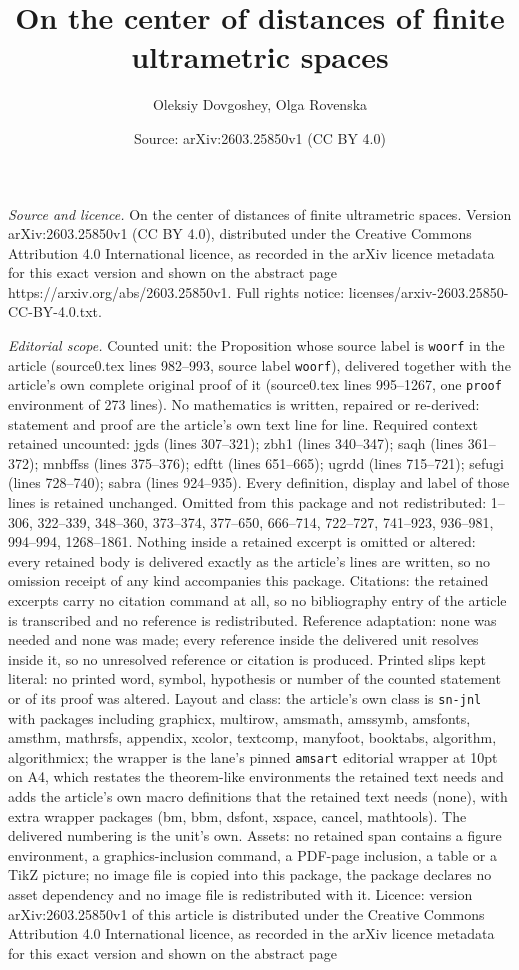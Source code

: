 \documentclass[10pt,a4paper]{amsart}
\title[On the center of distances of finite ultrametric spaces]{On the center of distances of finite ultrametric spaces}
\author{Oleksiy Dovgoshey, Olga Rovenska}
\date{Source: arXiv:2603.25850v1 (CC BY 4.0)}
\begin{document}
\maketitle

\noindent\emph{Source and licence.} On the center of distances of finite ultrametric spaces. Version arXiv:2603.25850v1 (CC BY 4.0), distributed under the Creative Commons Attribution 4.0 International licence, as recorded in the arXiv licence metadata for this exact version and shown on the abstract page https://arxiv.org/abs/2603.25850v1. Full rights notice: licenses/arxiv-2603.25850-CC-BY-4.0.txt.\par\smallskip

\noindent\textit{Editorial scope.} Counted unit: the Proposition whose source label is \texttt{woorf} in the article (source0.tex lines 982--993, source label \texttt{woorf}), delivered together with the article's own complete original proof of it (source0.tex lines 995--1267, one \texttt{proof} environment of 273 lines). No mathematics is written, repaired or re-derived: statement and proof are the article's own text line for line. Required context retained uncounted: jgds (lines 307--321); zbh1 (lines 340--347); saqh (lines 361--372); mnbffss (lines 375--376); edftt (lines 651--665); ugrdd (lines 715--721); sefugi (lines 728--740); sabra (lines 924--935). Every definition, display and label of those lines is retained unchanged. Omitted from this package and not redistributed: 1--306, 322--339, 348--360, 373--374, 377--650, 666--714, 722--727, 741--923, 936--981, 994--994, 1268--1861. Nothing inside a retained excerpt is omitted or altered: every retained body is delivered exactly as the article's lines are written, so no omission receipt of any kind accompanies this package. Citations: the retained excerpts carry no citation command at all, so no bibliography entry of the article is transcribed and no reference is redistributed. Reference adaptation: none was needed and none was made; every reference inside the delivered unit resolves inside it, so no unresolved reference or citation is produced. Printed slips kept literal: no printed word, symbol, hypothesis or number of the counted statement or of its proof was altered. Layout and class: the article's own class is \texttt{sn-jnl} with packages including graphicx, multirow, amsmath, amssymb, amsfonts, amsthm, mathrsfs, appendix, xcolor, textcomp, manyfoot, booktabs, algorithm, algorithmicx; the wrapper is the lane's pinned \texttt{amsart} editorial wrapper at 10pt on A4, which restates the theorem-like environments the retained text needs and adds the article's own macro definitions that the retained text needs (none), with extra wrapper packages (bm, bbm, dsfont, xspace, cancel, mathtools). The delivered numbering is the unit's own. Assets: no retained span contains a figure environment, a graphics-inclusion command, a PDF-page inclusion, a table or a TikZ picture; no image file is copied into this package, the package declares no asset dependency and no image file is redistributed with it. Licence: version arXiv:2603.25850v1 of this article is distributed under the Creative Commons Attribution 4.0 International licence, as recorded in the arXiv licence metadata for this exact version and shown on the abstract page 
\end{document}
